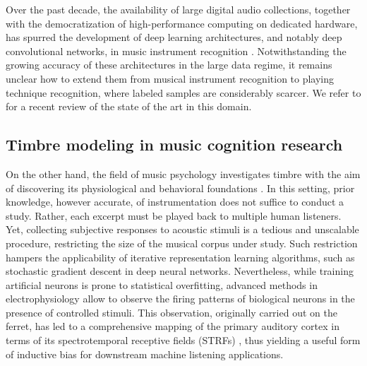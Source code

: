 \documentclass{bmcart}
\begin{document}
Over the past decade, the availability of large digital audio collections, together with the democratization of high-performance computing on dedicated hardware, has spurred the development of deep learning architectures, and notably deep convolutional networks, in music instrument recognition \cite{mcfee2015ismir,pons2017eusipco,gururani2018ismir}.
Notwithstanding the growing accuracy of these architectures in the large data regime, it remains unclear how to extend them from musical instrument recognition to playing technique recognition, where labeled samples are considerably scarcer.
We refer to \cite{han2017taslp} for a recent review of the state of the art in this domain.


\subsection*{Timbre modeling in music cognition research}
On the other hand, the field of music psychology investigates timbre with the aim of discovering its physiological and behavioral foundations \cite{mcadams2009chapter}.
In this setting, prior knowledge, however accurate, of instrumentation does not suffice to conduct a study.
Rather, each excerpt must be played back to multiple human listeners.
Yet, collecting subjective responses to acoustic stimuli is a tedious and unscalable procedure, restricting the size of the musical corpus under study.
Such restriction hampers the applicability of iterative representation learning algorithms, such as stochastic gradient descent in deep neural networks.
Nevertheless, while training artificial neurons is prone to statistical overfitting, advanced methods in electrophysiology allow to observe the firing patterns of biological neurons in the presence of controlled stimuli.
This observation, originally carried out on the ferret, has led to a comprehensive mapping of the primary auditory cortex in terms of its spectrotemporal receptive fields (STRFs) \cite{depireux2001jneur}, thus yielding a useful form of inductive bias for downstream machine listening applications.
\end{document}

